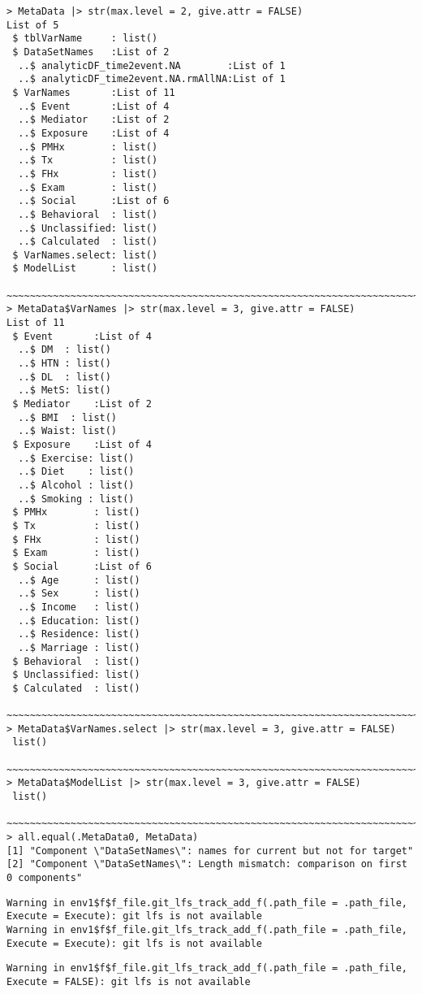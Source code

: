 \documentclass[
]{article}
\begin{document}
\begin{verbatim}
> MetaData |> str(max.level = 2, give.attr = FALSE)  
List of 5
 $ tblVarName     : list()
 $ DataSetNames   :List of 2
  ..$ analyticDF_time2event.NA        :List of 1
  ..$ analyticDF_time2event.NA.rmAllNA:List of 1
 $ VarNames       :List of 11
  ..$ Event       :List of 4
  ..$ Mediator    :List of 2
  ..$ Exposure    :List of 4
  ..$ PMHx        : list()
  ..$ Tx          : list()
  ..$ FHx         : list()
  ..$ Exam        : list()
  ..$ Social      :List of 6
  ..$ Behavioral  : list()
  ..$ Unclassified: list()
  ..$ Calculated  : list()
 $ VarNames.select: list()
 $ ModelList      : list()
    ~~~~~~~~~~~~~~~~~~~~~~~~~~~~~~~~~~~~~~~~~~~~~~~~~~~~~~~~~~~~~~~~~~~~~~~~    
> MetaData$VarNames |> str(max.level = 3, give.attr = FALSE)  
List of 11
 $ Event       :List of 4
  ..$ DM  : list()
  ..$ HTN : list()
  ..$ DL  : list()
  ..$ MetS: list()
 $ Mediator    :List of 2
  ..$ BMI  : list()
  ..$ Waist: list()
 $ Exposure    :List of 4
  ..$ Exercise: list()
  ..$ Diet    : list()
  ..$ Alcohol : list()
  ..$ Smoking : list()
 $ PMHx        : list()
 $ Tx          : list()
 $ FHx         : list()
 $ Exam        : list()
 $ Social      :List of 6
  ..$ Age      : list()
  ..$ Sex      : list()
  ..$ Income   : list()
  ..$ Education: list()
  ..$ Residence: list()
  ..$ Marriage : list()
 $ Behavioral  : list()
 $ Unclassified: list()
 $ Calculated  : list()
    ~~~~~~~~~~~~~~~~~~~~~~~~~~~~~~~~~~~~~~~~~~~~~~~~~~~~~~~~~~~~~~~~~~~~~~~~    
> MetaData$VarNames.select |> str(max.level = 3, give.attr = FALSE)  
 list()
    ~~~~~~~~~~~~~~~~~~~~~~~~~~~~~~~~~~~~~~~~~~~~~~~~~~~~~~~~~~~~~~~~~~~~~~~~    
> MetaData$ModelList |> str(max.level = 3, give.attr = FALSE)  
 list()
    ~~~~~~~~~~~~~~~~~~~~~~~~~~~~~~~~~~~~~~~~~~~~~~~~~~~~~~~~~~~~~~~~~~~~~~~~    
> all.equal(.MetaData0, MetaData)  
[1] "Component \"DataSetNames\": names for current but not for target"             
[2] "Component \"DataSetNames\": Length mismatch: comparison on first 0 components"
\end{verbatim}

\begin{verbatim}
Warning in env1$f$f_file.git_lfs_track_add_f(.path_file = .path_file, Execute = Execute): git lfs is not available  
Warning in env1$f$f_file.git_lfs_track_add_f(.path_file = .path_file, Execute = Execute): git lfs is not available  
\end{verbatim}

\begin{verbatim}
Warning in env1$f$f_file.git_lfs_track_add_f(.path_file = .path_file, Execute = FALSE): git lfs is not available  
\end{verbatim}
\end{document}
